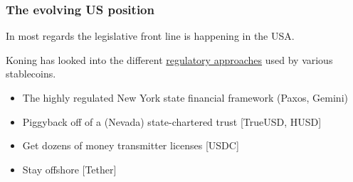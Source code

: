 \subsubsection{The evolving US position}
In most regards the legislative front line is happening in the USA. \par
Koning has looked into the different \href{http://jpkoning.blogspot.com/2021/08/stablecoin-regulatory-strategies.html}{regulatory approaches} used by various stablecoins.\par
\begin{itemize}
\item The highly regulated New York state financial framework (Paxos, Gemini)
\item Piggyback off of a (Nevada) state-chartered trust [TrueUSD, HUSD]
\item Get dozens of money transmitter licenses [USDC]
\item Stay offshore [Tether]
\end{itemize}

